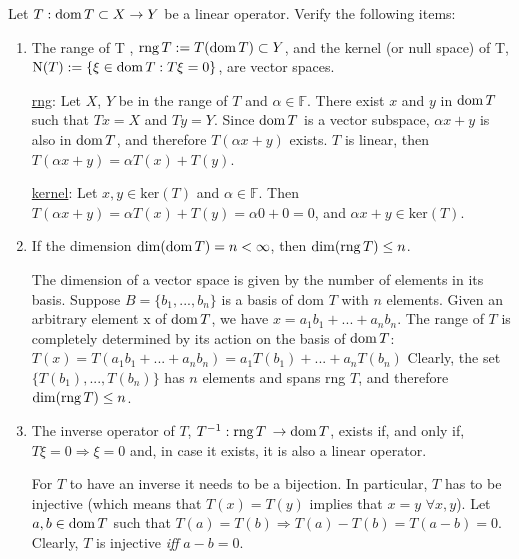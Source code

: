 \documentclass{article}
\theoremstyle{exercisestyle}
\newenvironment{exercise}[1]
  {\renewcommand\theinnerex{#1}\innerex}
  {\endinnerex}
\begin{document}
\begin{exercise}{1.1.5}
    Let $T : \operatorname{dom}{T} \subset X \rightarrow Y$ be a linear operator. Verify the following
    items:

    \begin{enumerate}
        \item The range of T , $\operatorname{rng} T := T (\operatorname{dom} T) \subset Y$, and the kernel (or null space) of T,
              $\operatorname{N}(T) := \{\xi \in \operatorname{dom} T : T \xi = 0\}$, are vector spaces.


              \underline{rng}: Let $X$, $Y$ be in the range of $T$ and $\alpha \in \mathbb{F}$. There
              exist $x$ and $y$ in $\operatorname{dom} T$ such that $Tx=X$ and $Ty = Y$. Since $\operatorname{dom} T$ is a vector
              subspace, $\alpha x + y$ is also in $\operatorname{dom} T$, and therefore $T(\alpha x + y)$ exists. $T$
              is linear, then $T(\alpha x + y) = \alpha T(x) + T(y)$.


              \underline{kernel}:
              Let $x, y \in \textrm{ker}(T)$ and $\alpha \in \mathbb{F}$. Then $T(\alpha x+y) = \alpha T(x) + T(y) = \alpha 0 + 0 = 0$,
              and $\alpha x + y \in \textrm{ker}(T)$.


        \item If the dimension $\dim(\operatorname{dom} T) = n < \infty$, then $\dim(\operatorname{rng} T ) \leq n$.


              The dimension of a vector space is given by the number of elements in its basis. Suppose $B = \{ b_1, ..., b_n\}$
              is a basis of dom $T$ with $n$ elements. Given an arbitrary element x of $\operatorname{dom} T$, we have $x = a_1 b_1 + ... + a_n b_n$.
              The range of $T$ is completely determined by its action on the basis of $\operatorname{dom} T$:
              \begin{math}
                  T(x) = T(a_1 b_1 + ... + a_n b_n) = a_1 T(b_1) + ... + a_n T(b_n)
              \end{math}
              Clearly, the set $\{T(b_1), ... , T(b_n)\}$ has $n$ elements and spans rng $T$, and therefore  $\dim(\operatorname{rng} T) \leq n$.


        \item The inverse operator of $T$, $T^{-1}: \operatorname{rng} T$ $\rightarrow \operatorname{dom} T$, exists if, and only if, $T\xi = 0 \Rightarrow \xi = 0$
              and, in case it exists, it is also a linear operator.


              For $T$ to have an inverse it needs to be a bijection. In particular, $T$ has to be injective (which means that $T(x) = T(y)$ implies that $x=y$ $\forall x, y$).
              Let $a,b \in \operatorname{dom} T$ such that $T(a) = T(b) \Rightarrow T(a) - T(b) = T(a-b) = 0$. Clearly, $T$
              is injective \textit{iff} $a-b = 0$.


\end{enumerate}
\end{exercise}
\end{document}
